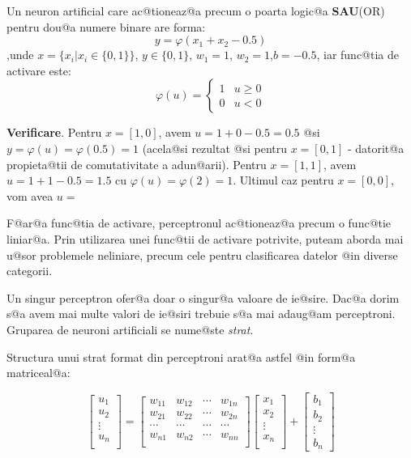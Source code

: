 \begin{exemplu}

	Un neuron artificial care ac@tioneaz@a precum o poarta logic@a {\bf SAU}(OR) pentru dou@a numere binare are forma:
$$
	y = \varphi ( x_1 + x_2 - 0.5 )
$$
,unde $x = \{ x_i | x_i \in \{0, 1\} \}$, $y \in \{0, 1\}$, $w_1 = 1$, $w_2 = 1$,$b = -0.5$, iar func@tia de activare este: 
$$
	\varphi ( u ) = \left\lbrace
		\begin{array}{lc}
			1 & u \geq 0 \\
			0 & u < 0
		\end{array}
	\right.
$$
\end{exemplu}

{\bf Verificare}. Pentru $x = [1, 0]$, avem $u = 1 + 0 - 0.5 = 0.5$ @si $y = \varphi(u) = \varphi(0.5) = 1$ (acela@si rezultat @si pentru $x = [0, 1]$ - datorit@a propieta@tii de comutativitate a adun@arii).
Pentru $x = [1, 1]$, avem $u = 1 + 1 - 0.5 = 1.5$ cu $\varphi (u) = \varphi ( 2 ) = 1$. Ultimul caz pentru $x = [0, 0]$, vom avea $u = $

\begin{observatia}
	F@ar@a func@tia de activare, perceptronul ac@tioneaz@a precum o func@tie liniar@a. Prin utilizarea unei func@tii de activare potrivite, puteam aborda mai u@sor problemele neliniare, precum cele pentru clasificarea datelor @in diverse categorii.
\end{observatia}

Un singur perceptron ofer@a doar o singur@a valoare de ie@sire. Dac@a dorim s@a avem mai multe valori de ie@siri trebuie s@a mai adaug@am perceptroni. Gruparea de neuroni artificiali se nume@ste {\sl strat}.

Structura unui strat format din perceptroni arat@a astfel @in form@a matriceal@a:

$$
	\begin{bmatrix}
		u_1 \\
		u_2 \\
		\vdots \\ 
		u_n \\
	\end{bmatrix}	
	= 
	\begin{bmatrix}
		w_{11} & w_{12} & \cdots & w_{1n} \\
		w_{21} & w_{22} & \cdots & w_{2n} \\
		\cdots & \cdots & \cdots & \cdots \\
		w_{n1} & w_{n2} & \cdots & w_{nn} \\
	\end{bmatrix}
	\begin{bmatrix}
		x_1 \\
		x_2 \\
		\vdots \\
		x_n \\
	\end{bmatrix}
	+
	\begin{bmatrix}
		b_1 \\
		b_2 \\
		\vdots \\
		b_n
	\end{bmatrix}
$$

